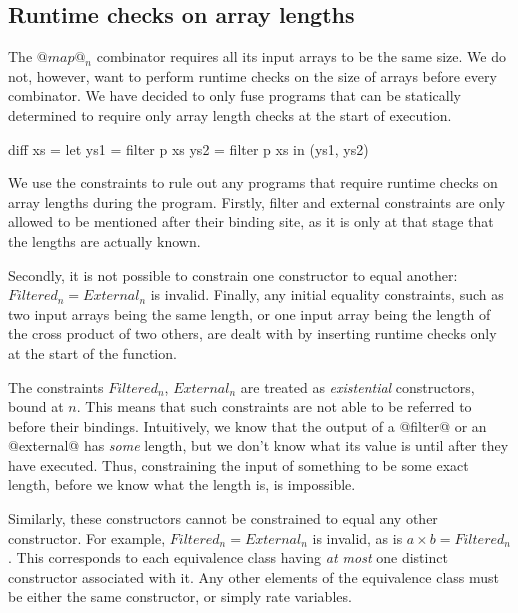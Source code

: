 \subsection{Runtime checks on array lengths}
The $@map@_n$ combinator requires all its input arrays to be the same size.
We do not, however, want to perform runtime checks on the size of arrays before every combinator.
We have decided to only fuse programs that can be statically determined to require only array length checks at the start of execution. 

\begin{code}
 diff xs = let ys1 = filter p xs
               ys2 = filter p xs
           in  (ys1, ys2)
\end{code}




We use the constraints to rule out any programs that require runtime checks on array lengths during the program. Firstly, filter and external constraints are only allowed to be mentioned after their binding site, as it is only at that stage that the lengths are actually known.


Secondly, it is not possible to constrain one constructor to equal another: $Filtered_n = External_n$ is invalid. Finally, any initial equality constraints, such as two input arrays being the same length, or one input array being the length of the cross product of two others, are dealt with by inserting runtime checks only at the start of the function.


The constraints $Filtered_n$, $External_n$ are treated as \emph{existential} constructors, bound at $n$. This means that such constraints are not able to be referred to before their bindings.
Intuitively, we know that the output of a @filter@ or an @external@ has \emph{some} length, but we don't know what its value is until after they have executed. Thus, constraining the input of something to be some exact length, before we know what the length is, is impossible.

Similarly, these constructors cannot be constrained to equal any other constructor. 
For example, $Filtered_n = External_n$ is invalid, as is $a \times b = Filtered_n$.
This corresponds to each equivalence class having \emph{at most} one distinct constructor associated with it. Any other elements of the equivalence class must be either the same constructor, or simply rate variables.

